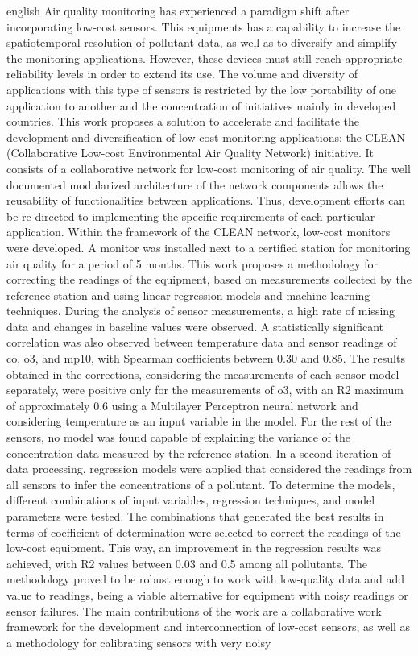 \begin{resumo}[Abstract]
\begin{otherlanguage*}{english}
		Air quality monitoring has experienced a paradigm shift after incorporating  low-cost sensors. This equipments has a capability to increase the spatiotemporal resolution of pollutant data, as well as to diversify and simplify the monitoring applications. However, these devices must still reach appropriate reliability levels in order to extend its use. The volume and diversity of applications with this type of sensors is restricted by the low portability of one application to another and the concentration of initiatives mainly in developed countries. This work proposes a solution to accelerate and facilitate the development and diversification of low-cost monitoring applications: the CLEAN (Collaborative Low-cost Environmental Air Quality Network) initiative. It consists of a collaborative network for low-cost monitoring of air quality. The well documented modularized architecture of the network components allows the reusability of functionalities between applications. Thus, development efforts can be re-directed to implementing the specific requirements of each particular application. Within the framework of the CLEAN network, low-cost monitors were developed. A monitor was installed next to a certified station for monitoring air quality for a period of 5 months. This work proposes a methodology for correcting the readings of the equipment, based on measurements collected by the reference station and using linear regression models and machine learning techniques. During the analysis of sensor measurements, a high rate of missing data and changes in baseline values were observed. A statistically significant correlation was also observed between temperature data and sensor readings of \acrshort{co}, \acrshort{o3}, and \acrshort{mp10}, with Spearman coefficients between 0.30 and 0.85. The results obtained in the corrections, considering the measurements of each sensor model separately, were positive only for the measurements of \acrshort{o3}, with an R2 maximum of approximately 0.6 using a Multilayer Perceptron neural network and considering temperature as an input variable in the model. For the rest of the sensors, no model was found capable of explaining the variance of the concentration data measured by the reference station. In a second iteration of data processing, regression models were applied that considered the readings from all sensors to infer the concentrations of a pollutant. To determine the models, different combinations of input variables, regression techniques, and model parameters were tested. The combinations that generated the best results in terms of coefficient of determination were selected to correct the readings of the low-cost equipment. This way, an improvement in the regression results was achieved, with R2 values between 0.03 and 0.5 among all pollutants. The methodology proved to be robust enough to work with low-quality data and add value to readings, being a viable alternative for equipment with noisy readings or sensor failures. The main contributions of the work are a collaborative work framework for the development and interconnection of low-cost sensors, as well as a methodology for calibrating sensors with very noisy 
\end{otherlanguage*}
\end{resumo}
